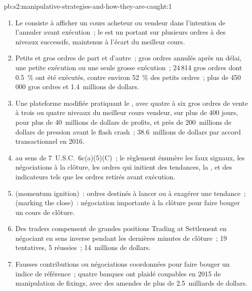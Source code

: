 \begin{solution}{pb:s2:manipulative-strategies-and-how-they-are-caught:1}
\begin{enumerate}
\item Le  consiste à afficher un cours acheteur ou vendeur dans l'intention de l'annuler avant exécution~; le  est un  portant sur plusieurs ordres à des niveaux successifs, maintenus
à l'écart du meilleur cours.
\item Petits et gros ordres de part et d'autre~; gros ordres annulés après un délai, une petite exécution ou une seule grosse exécution~; 24\,814 gros ordres dont
0.5~\% ont été exécutés, contre environ 52~\% des petits ordres~; plus de 450\,000 gros ordres et 1.4~millions de dollars.
\item Une plateforme modifiée pratiquant le , avec quatre à six gros ordres de vente à trois ou quatre niveaux du meilleur cours vendeur, sur plus de 400 jours, pour plus de 40~millions de dollars de profits,
et près de 200~millions de dollars de pression avant le flash crash~; 38.6~millions de dollars par accord transactionnel en 2016.
\item {} au sens de 7~U.S.C.~6c(a)(5)(C)~; le règlement énumère les faux signaux, les négociations à la clôture, les ordres qui initient des tendances, la , et des indicateurs tels que les ordres retirés avant exécution.
\item {} (momentum ignition)~: ordres destinés à lancer ou à exagérer une tendance~;  (marking the close)~: négociation importante à la clôture pour faire bouger un cours de clôture.
\item Des traders compensent de grandes positions Trading at Settlement en négociant en sens inverse pendant les dernières minutes de clôture~; 19 tentatives, 5 réussies~; 14~millions de dollars.
\item Fausses contributions ou négociations coordonnées pour faire bouger un indice de référence~; quatre banques ont plaidé coupables en 2015 de manipulation de fixings, avec des amendes de plus de 2.5~milliards de dollars.

\end{enumerate}
\end{solution}
